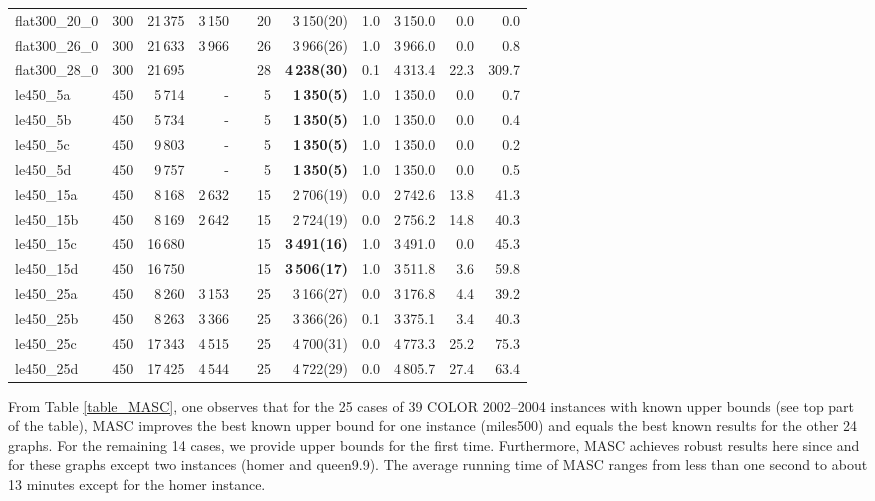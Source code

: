 \documentclass{elsart}
\begin{document}
\begin{table}
\begin{scriptsize}
\begin{tabular}{lrrrcrrrrrr}
flat300\_20\_0    & 300 & 21\,375 & 3\,150 &&20& 3\,150(20) &1.0& 3\,150.0&0.0 & 0.0 \\
flat300\_26\_0    & 300 & 21\,633 & 3\,966 &&26& 3\,966(26) &1.0& 3\,966.0&0.0 & 0.8 \\
flat300\_28\_0    & 300 & 21\,695 &   &&28&  \textbf{4\,238(30)} &0.1& 4\,313.4&22.3 & 309.7 \\
le450\_5a    & 450 & 5\,714  &-  &&5&\textbf{1\,350(5)}  &1.0& 1\,350.0 &0.0 & 0.7  \\
le450\_5b    & 450 & 5\,734  &-  &&5&\textbf{1\,350(5)}   &1.0& 1\,350.0 &0.0 & 0.4  \\
le450\_5c    & 450 & 9\,803  &-  &&5&\textbf{1\,350(5)}   &1.0& 1\,350.0 &0.0 & 0.2  \\
le450\_5d    & 450 & 9\,757  &-  &&5&\textbf{1\,350(5)}   &1.0& 1\,350.0 &0.0 & 0.5  \\
le450\_15a    & 450 & 8\,168  &2\,632 &&15&2\,706(19)  &0.0& 2\,742.6&13.8 & 41.3  \\
le450\_15b    & 450 & 8\,169 & 2\,642  &&15& 2\,724(19) &0.0& 2\,756.2&14.8 & 40.3 \\
le450\_15c    & 450 & 16\,680 &  &&15& \textbf{3\,491(16)} &1.0& 3\,491.0&0.0 & 45.3  \\
le450\_15d    & 450 & 16\,750 &   &&15&  \textbf{3\,506(17)} &1.0& 3\,511.8&3.6 &59.8 \\
le450\_25a    & 450 & 8\,260 &3\,153 &&25&3\,166(27) &0.0& 3\,176.8&4.4 & 39.2 \\
le450\_25b    & 450 & 8\,263 & 3\,366 &&25& 3\,366(26) &0.1& 3\,375.1&3.4 & 40.3 \\
le450\_25c    & 450 & 17\,343 & 4\,515  &&25& 4\,700(31) &0.0& 4\,773.3&25.2 & 75.3  \\
le450\_25d    & 450 & 17\,425 & 4\,544 &&25& 4\,722(29) &0.0& 4\,805.7&27.4 & 63.4  \\
\hline
\end{tabular}
\end{scriptsize}
\end{table}
\renewcommand{\baselinestretch}{1.0}\large\normalsize


From Table \ref{table_MASC}, one observes that for the 25 cases of 39 COLOR 2002--2004 instances with known upper bounds (see top part of the table), MASC improves the best known upper bound for one instance (miles500) and equals the best known results for the other 24 graphs. For the remaining 14 cases, we provide upper bounds for the first time. Furthermore, MASC achieves robust results here since  and  for these graphs except two instances (homer and queen9.9). The average running time of MASC ranges from less than one second to about 13 minutes except for the homer instance.
\end{document}
